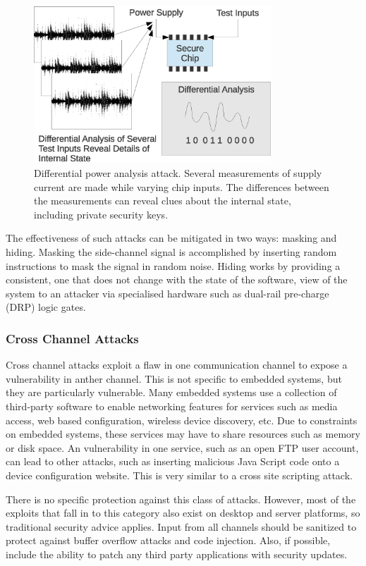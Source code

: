\documentclass[final,conference,11pt]{IEEEtran}
\begin{document}
\begin{figure}[!t]
\centering
\includegraphics[width=3.5in]{diffpower}
\caption{Differential power analysis attack.  Several measurements of supply current are made while varying chip inputs.  The differences between the measurements can reveal clues about the internal state, including private security keys. }
\label{fig:side_chan}
\end{figure}

The effectiveness of such attacks can be mitigated in two ways: masking and hiding.  Masking the side-channel signal is accomplished by inserting random instructions to mask the signal in random noise.  Hiding works by providing a consistent, one that does not change with the state of the software, view of the system to an attacker via specialised hardware such as dual-rail pre-charge (DRP) logic gates.\cite{papers??}

\subsubsection{Cross Channel Attacks}
Cross channel attacks exploit a flaw in one communication channel to expose a vulnerability in anther channel.  This is not specific to embedded systems, but they are particularly vulnerable.  Many embedded systems use a collection of third-party software to enable networking features for services such as media access, web based configuration, wireless device discovery, etc.  Due to constraints on embedded systems, these services may have to share resources such as memory or disk space.   An vulnerability in one service, such as an open FTP user account, can lead to other attacks, such as inserting malicious Java Script code onto a device configuration website.  This is very similar to a cross site scripting attack.

There is no specific protection against this class of attacks.  However, most of the exploits that fall in to this category also exist on desktop and server platforms, so traditional security advice applies.  Input from all channels should be sanitized to protect against buffer overflow attacks and code injection.  Also, if possible, include the ability to patch any third party applications with security updates. \cite{emerge ccs paper}
\end{document}
